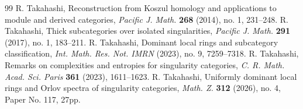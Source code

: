 \documentclass[10pt]{amsart}
\theoremstyle{definition}
\theoremstyle{remark}
\numberwithin{equation}{thm}
\begin{document}
\begin{thebibliography}{99}
{\sc R. Takahashi}, Reconstruction from Koszul homology and applications to module and derived categories, {\em Pacific J. Math.} {\bf 268} (2014), no. 1, 231--248.
{\sc R. Takahashi}, Thick subcategories over isolated singularities, {\em Pacific J. Math.} {\bf 291} (2017), no. 1, 183--211.
{\sc R. Takahashi}, Dominant local rings and subcategory classification, {\em Int. Math. Res. Not. IMRN} (2023), no. 9, 7259--7318.
{\sc R. Takahashi}, Remarks on complexities and entropies for singularity categories, {\em C. R. Math. Acad. Sci. Paris} {\bf 361} (2023), 1611--1623.
{\sc R. Takahashi}, Uniformly dominant local rings and Orlov spectra of singularity categories, {\em Math. Z.} {\bf 312} (2026), no. 4, Paper No. 117, 27pp.
\end{thebibliography}
\end{document}
